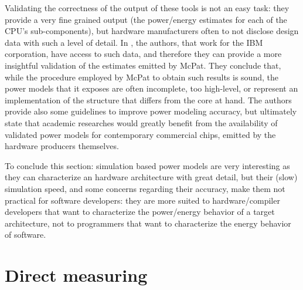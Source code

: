 \par Validating the correctness of the output of these tools is not an easy task: they provide a very fine grained output (the power/energy estimates for each of the CPU's sub-components), but hardware manufacturers often to not disclose design data with such a level of detail. In \cite{mcpat-valid}, the authors, that work for the IBM corporation, have access to such data, and therefore they can provide a more insightful validation of the estimates emitted by McPat. They conclude that, while the procedure employed by McPat to obtain such results is sound, the power models that it exposes are often incomplete, too high-level, or represent an implementation of the structure that differs from the core at hand. The authors provide also some guidelines to improve power modeling accuracy, but ultimately state that academic researches would greatly benefit from the availability of validated power models for contemporary commercial chips, emitted by the hardware producers themselves.
\par To conclude this section: simulation based power models are very interesting as they can characterize an hardware architecture with great detail, but their (slow) simulation speed, and some concerns regarding their accuracy, make them not practical for software developers: they are more suited to hardware/compiler developers that want to characterize the power/energy behavior of a target architecture, not to programmers that want to characterize the energy behavior of software.

\section{Direct measuring}

